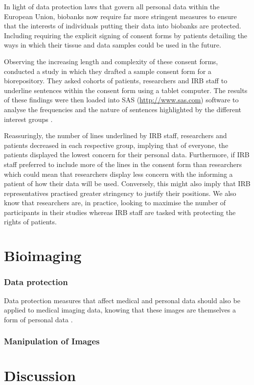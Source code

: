\documentclass[british,a4paper, 12pt]{article}
\begin{document}
In light of data protection laws that govern all personal data within the European Union,
biobanks now require far more stringent measures to ensure that the interests of individuals
putting their data into biobanks are protected. Including requiring the explicit signing of
consent forms by patients detailing the ways in which their tissue and data samples could
be used in the future.

Observing the increasing length and complexity of these consent forms,
\citeauthor*{beskow2010simplifyinog} conducted a study in which they drafted a sample consent form
for a biorepository. They asked cohorts of patients, researchers and IRB staff to underline
sentences within the consent form using a tablet computer. The results of these findings were
then loaded into SAS (\url{http://www.sas.com}) software to analyse the frequencies and the nature
of sentences highlighted by the different interest groups \parencite{beskow2010simplifyinog}.

Reassuringly, the number of lines underlined by IRB staff, researchers and patients decreased in
each respective group, implying that of everyone, the patients displayed the lowest concern for
their personal data. Furthermore, if IRB staff preferred to include more of the lines in the
consent form than researchers which could mean that researchers display less concern with the
informing a patient of how their data will be used. Conversely, this might also imply that IRB
representatives practised greater stringency to justify their positions. We also know that
researchers are, in practice, looking to maximise the number of participants in their studies
whereas IRB staff are tasked with protecting the rights of patients.


\section{Bioimaging}

\subsubsection{Data protection}
Data protection measures that affect medical and personal data should also be 
applied to medical imaging data, knowing that these images are themselves a form 
of personal data \parencite{duquenoy2008considering}.

\subsubsection{Manipulation of Images}

\section{Discussion}

\printbibliography
\end{document}
